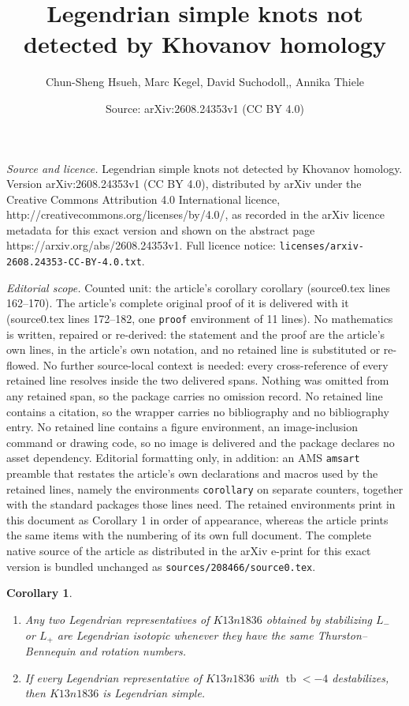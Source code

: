 \documentclass[10pt,a4paper]{amsart}
\title{Legendrian simple knots not detected by Khovanov homology}
\author{Chun-Sheng Hsueh, Marc Kegel, David Suchodoll,, Annika Thiele}
\date{Source: arXiv:2608.24353v1 (CC BY 4.0)}
\newtheorem{corollary}{Corollary}
\DeclareMathOperator{\tb}{tb}
\begin{document}
\maketitle

\noindent\emph{Source and licence.} Legendrian simple knots not detected by Khovanov homology. Version arXiv:2608.24353v1 (CC BY 4.0), distributed by arXiv under the Creative Commons Attribution 4.0 International licence, http://creativecommons.org/licenses/by/4.0/, as recorded in the arXiv licence metadata for this exact version and shown on the abstract page https://arxiv.org/abs/2608.24353v1. Full licence notice: \texttt{licenses/arxiv-2608.24353-CC-BY-4.0.txt}.\par\smallskip

\noindent\textit{Editorial scope.} Counted unit: the article's corollary corollary (source0.tex lines 162--170). The article's complete original proof of it is delivered with it (source0.tex lines 172--182, one \texttt{proof} environment of 11 lines). No mathematics is written, repaired or re-derived: the statement and the proof are the article's own lines, in the article's own notation, and no retained line is substituted or re-flowed.  No further source-local context is needed: every cross-reference of every retained line resolves inside the two delivered spans.  Nothing was omitted from any retained span, so the package carries no omission record.  No retained line contains a citation, so the wrapper carries no bibliography and no bibliography entry.  No retained line contains a figure environment, an image-inclusion command or drawing code, so no image is delivered and the package declares no asset dependency.  Editorial formatting only, in addition: an AMS \texttt{amsart} preamble that restates the article's own declarations and macros used by the retained lines, namely the environments \texttt{corollary} on separate counters, together with the standard packages those lines need.  The retained environments print in this document as Corollary 1 in order of appearance, whereas the article prints the same items with the numbering of its own full document.  The complete native source of the article as distributed in the arXiv e-print for this exact version is bundled unchanged as \texttt{sources/208466/source0.tex}.
\begin{corollary}\hfill
\begin{enumerate}
    \item Any two Legendrian representatives of \(K13n1836\) obtained by stabilizing
\(L_-\) or \(L_+\) are Legendrian isotopic whenever they have the same
Thurston--Bennequin and rotation numbers.
    \item If every Legendrian representative of \(K13n1836\) with
\(\tb<-4\) destabilizes, then \(K13n1836\) is Legendrian simple.
\end{enumerate}
\end{corollary}
\end{document}
